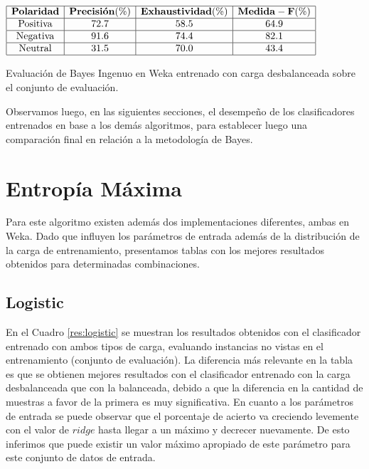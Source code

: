 
\begin{table}[htb] 
\centering

$
\begin{array}{|c|c|c|c|}
      \hline
      \mathbf{Polaridad} & \mathbf{Precisi\acute{o}n(\%)} & \mathbf{Exhaustividad(\%)} & \mathbf{Medida-F(\%)}	\\
      \hline
      \mathrm{Positiva}  & 72.7	& 58.5 & 64.9	\\
      \hline
      \mathrm{Negativa}  & 91.6 & 74.4 & 82.1	\\
      \hline
      \mathrm{Neutral}	 & 31.5 & 70.0 & 43.4	\\
      \hline
\end{array}
$
\caption{Evaluaci\'on de Bayes Ingenuo en Weka entrenado con carga desbalanceada sobre el conjunto de evaluaci\'on.}
\label{res:bayesweka_desbaleval}
\end{table}


Observamos luego, en las siguientes secciones, el desempe\~no de los clasificadores entrenados en base a los dem\'as algoritmos, para establecer luego una comparaci\'on final en relaci\'on a la metodolog\'ia de Bayes.


\section{Entrop\'ia M\'axima}

Para este algoritmo existen adem\'as dos implementaciones diferentes, ambas en Weka. Dado que influyen los par\'ametros de entrada adem\'as de la distribuci\'on de la carga de entrenamiento, presentamos tablas con los mejores resultados obtenidos para determinadas combinaciones.

\subsection{Logistic}

En el Cuadro \ref{res:logistic} se muestran los resultados obtenidos con el clasificador entrenado con ambos tipos de carga, evaluando instancias no vistas en el entrenamiento (conjunto de evaluaci\'on). La diferencia m\'as relevante en la tabla es que se obtienen mejores resultados con el clasificador entrenado con la carga desbalanceada que con la balanceada, debido a que la diferencia en la cantidad de muestras a favor de la primera es muy significativa. En cuanto a los par\'ametros de entrada se puede observar que el porcentaje de acierto va creciendo levemente con el valor de $ridge$ hasta llegar a un m\'aximo y decrecer nuevamente. De esto inferimos que puede existir un valor m\'aximo apropiado de este par\'ametro para este conjunto de datos de entrada.

